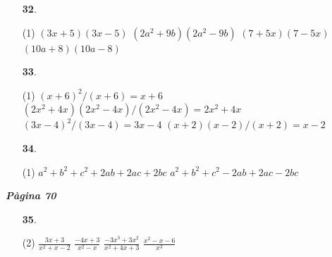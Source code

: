 \documentclass[a4paper, pdf, twoside]{book}
\begin{document}
\begin{multicols}{2}
\begin{enumerate}

 \item[\fontfamily{phv}\selectfont\color{blue}\textbf{32}. ] 
 \begin{tasks}[column-sep=1em, item-indent=1.3333em](1)
	 \task $(3x+5)(3x-5)$
	 \task $(2a^2+9b)(2a^2-9b)$
	 \task $(7+5x)(7-5x)$
	 \task $(10a+8)(10a-8)$
\end{tasks}
\vspace{0.25cm}



 \item[\fontfamily{phv}\selectfont\color{blue}\textbf{33}. ] 
 \begin{tasks}[column-sep=1em, item-indent=1.3333em](1)
	 \task $(x+6)^2 / (x+6)=x+6$
	 \task* $(2x^2+4x)(2x^2-4x)/(2x^2-4x)=2x^2+4x$
	 \task $(3x-4)^2/(3x-4)=3x-4$
	 \task $(x+2)(x-2)/(x+2)=x-2$
\end{tasks}
\vspace{0.25cm}



 \item[\fontfamily{phv}\selectfont\color{blue}\textbf{34}. ] 
 \begin{tasks}[column-sep=1em, item-indent=1.3333em](1)
	 \task $a^2+b^2+c^2+2ab+2ac+2bc$
	 \task $a^2+b^2+c^2-2ab+2ac-2bc$
\end{tasks}
 \end{enumerate}
\vspace{0.3cm}


{\textbf{\em Pàgina 70}} \hrulefill
\begin{enumerate}
\vspace{0.25cm}



 \item[\fontfamily{phv}\selectfont\color{blue}\textbf{35}. ]  \scalebox{0.6}{\simbolclau } 
 \begin{tasks}[column-sep=1em, item-indent=1.3333em](2)
	 \task $\frac {3x+3}{x^2+x-2}$
	 \task $\frac {-4x+3}{x^2-x}$
	 \task $\frac {-3x^3+3x^2}{x^2+4x+3}$
	 \task $\frac {x^2-x-6}{x^3}$
\end{tasks}
 \end{enumerate}
\begin{enumerate}
\vspace{0.25cm}




\end{enumerate}
\end{multicols}
\end{document}
